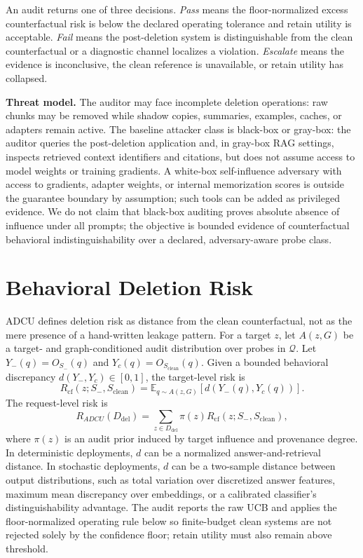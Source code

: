 \documentclass[10pt,journal,compsoc]{IEEEtran}
\newcommand{\method}{ADCU}
\begin{document}
An audit returns one of three decisions. \emph{Pass} means the floor-normalized excess counterfactual risk is below the declared operating tolerance and retain utility is acceptable. \emph{Fail} means the post-deletion system is distinguishable from the clean counterfactual or a diagnostic channel localizes a violation. \emph{Escalate} means the evidence is inconclusive, the clean reference is unavailable, or retain utility has collapsed.

\textbf{Threat model.}
The auditor may face incomplete deletion operations: raw chunks may be removed while shadow copies, summaries, examples, caches, or adapters remain active. The baseline attacker class is black-box or gray-box: the auditor queries the post-deletion application and, in gray-box RAG settings, inspects retrieved context identifiers and citations, but does not assume access to model weights or training gradients. A white-box self-influence adversary with access to gradients, adapter weights, or internal memorization scores is outside the guarantee boundary by assumption; such tools can be added as privileged evidence. We do not claim that black-box auditing proves absolute absence of influence under all prompts; the objective is bounded evidence of counterfactual behavioral indistinguishability over a declared, adversary-aware probe class.


\section{Behavioral Deletion Risk}

\method{} defines deletion risk as distance from the clean counterfactual, not as the mere presence of a hand-written leakage pattern. For a target $z$, let $A(z,G)$ be a target- and graph-conditioned audit distribution over probes in $\mathcal{Q}$. Let $Y_-(q)=O_{S_-}(q)$ and $Y_c(q)=O_{S_{\mathrm{clean}}}(q)$. Given a bounded behavioral discrepancy $d(Y_-,Y_c)\in[0,1]$, the target-level risk is
\[
R_{\mathrm{cf}}(z;S_-,S_{\mathrm{clean}})
=
\mathbb{E}_{q\sim A(z,G)}
\left[d(Y_-(q),Y_c(q))\right].
\]
The request-level risk is
\[
R_{\method}(D_{\mathrm{del}})=
\sum_{z\in D_{\mathrm{del}}}\pi(z)R_{\mathrm{cf}}(z;S_-,S_{\mathrm{clean}}),
\]
where $\pi(z)$ is an audit prior induced by target influence and provenance degree. In deterministic deployments, $d$ can be a normalized answer-and-retrieval distance. In stochastic deployments, $d$ can be a two-sample distance between output distributions, such as total variation over discretized answer features, maximum mean discrepancy over embeddings, or a calibrated classifier's distinguishability advantage. The audit reports the raw UCB and applies the floor-normalized operating rule below so finite-budget clean systems are not rejected solely by the confidence floor; retain utility must also remain above threshold.
\end{document}
